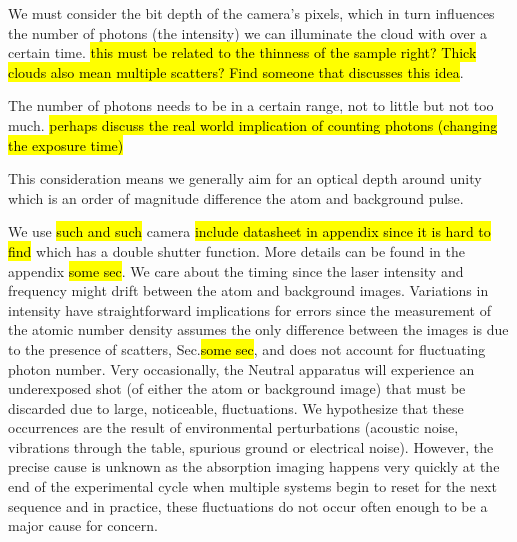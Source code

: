 We must consider the bit depth of the camera's pixels, which in turn influences the number of photons (the intensity) we can illuminate the cloud with over a certain time. \hl{this must be related to the thinness of the sample right? Thick clouds also mean multiple scatters? Find someone that discusses this idea}.
 
The number of photons needs to be in a certain range, not to little but not too much. \hl{perhaps discuss the real world implication of counting photons (changing the exposure time)} 

This consideration means we generally aim for an optical depth around unity which is an order of magnitude difference the atom and background pulse. 

We use \hl{such and such} camera \hl{include datasheet in appendix since it is hard to find} which has a double shutter function. More details can be found in the appendix \hl{some sec}. We care about the timing since the laser intensity and frequency might drift between the atom and background images. Variations in intensity have straightforward implications for errors since the measurement of the atomic number density assumes the only difference between the images is due to the presence of scatters, Sec.\hl{some sec}, and does not account for fluctuating photon number. Very occasionally, the Neutral apparatus will experience an underexposed shot (of either the atom or background image) that must be discarded due to large, noticeable, fluctuations. We hypothesize that these occurrences are the result of environmental perturbations (acoustic noise, vibrations through the table, spurious ground or electrical noise). However, the precise cause is unknown as the absorption imaging happens very quickly at the end of the experimental cycle when multiple systems begin to reset for the next sequence and in practice, these fluctuations do not occur often enough to be a major cause for concern.

